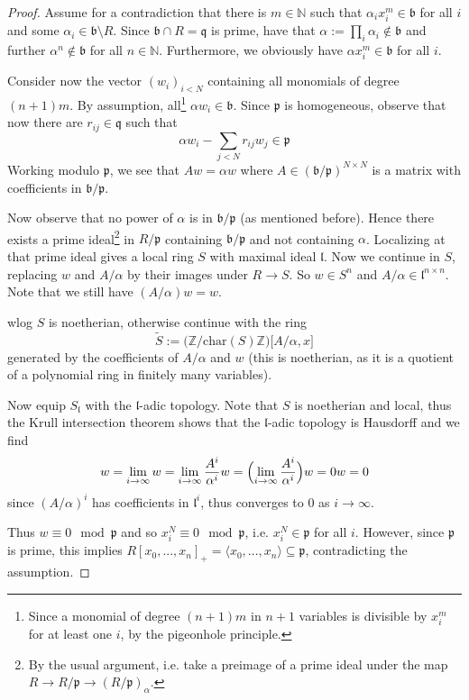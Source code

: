 \documentclass{scrartcl}
\newcommand{\N}{\mathbb{N}}
\newcommand{\Z}{\mathbb{Z}}
\newcommand{\p}{\mathfrak{p}}
\newcommand{\q}{\mathfrak{q}}
\renewcommand{\b}{\mathfrak{b}}
\theoremstyle{definition}
\begin{document}
\begin{proof}
    Assume for a contradiction  that there is $m \in \N$ such that $\alpha_i x_i^m \in \b$ for all $i$ and some $\alpha_i \in \b \setminus R$.
    Since $\b \cap R = \q$ is prime, have that $\alpha := \prod_i \alpha_i \notin \b$ and further $\alpha^n \notin \b$ for all $n \in \N$.
    Furthermore, we obviously have $\alpha x_i^m \in \b$ for all $i$.

    Consider now the vector $(w_i)_{i < N}$ containing all monomials of degree $(n + 1)m$.
    By assumption, all\footnote{Since a monomial of degree $(n + 1)m$ in $n + 1$ variables is divisible by $x_i^m$ for at least one $i$, by the pigeonhole principle.} $\alpha w_i \in \b$.
    Since $\p$ is homogeneous, observe that now there are $r_{ij} \in \q$ such that
    \begin{equation*}
        \alpha w_i - \sum_{j < N} r_{ij} w_j \in \p
    \end{equation*}
    Working modulo $\p$, we see that $A w = \alpha w$ where $A \in (\b/\p)^{N \times N}$ is a matrix with coefficients in $\b/\p$.

    Now observe that no power of $\alpha$ is in $\b/\p$ (as mentioned before).
    Hence there exists a prime ideal\footnote{By the usual argument, i.e. take a preimage of a prime ideal under the map $R \to R/\p \to (R/\p)_\alpha$.} in $R/\p$ containing $\b/\p$ and not containing $\alpha$.
    Localizing at that prime ideal gives a local ring $S$ with maximal ideal $\mathfrak{l}$.
    Now we continue in $S$, replacing $w$ and $A/\alpha$ by their images under $R \to S$.
    So $w \in S^n$ and $A/\alpha \in \mathfrak{l}^{n \times n}$.
    Note that we still have $(A/\alpha) w = w$.

    wlog $S$ is noetherian, otherwise continue with the ring
    \begin{equation*}
        \tilde{S} := \bigl( \Z / \mathrm{char}(S) \Z \bigr) \bigl[ A/\alpha, x \bigr]
    \end{equation*}
    generated by the coefficients of $A/\alpha$ and $w$ (this is noetherian, as it is a quotient of a polynomial ring in finitely many variables).
    
    Now equip $S_{\mathfrak{l}}$ with the $\mathfrak{l}$-adic topology.
    Note that $S$ is noetherian and local, thus the Krull intersection theorem \cite[8.41]{comalg_notes} shows that the $\mathfrak{l}$-adic topology is Hausdorff and we find
    \begin{equation*}
        w = \lim_{i \to \infty} w = \lim_{i \to \infty} \frac {A^i} {\alpha^i} w = \Bigl( \lim_{i \to \infty} \frac {A^i} {\alpha^i} \Bigr) w = 0 w = 0
    \end{equation*}
    since $(A/\alpha)^i$ has coefficients in $\mathfrak{l}^i$, thus converges to $0$ as $i \to \infty$.

    Thus $w \equiv 0 \mod \p$ and so $x_i^N \equiv 0 \mod \p$, i.e. $x_i^N \in \p$ for all $i$.
    However, since $\p$ is prime, this implies $R[x_0, ..., x_n]_+ = \langle x_0, ..., x_n \rangle \subseteq \p$, contradicting the assumption. 
\end{proof}
\end{document}
